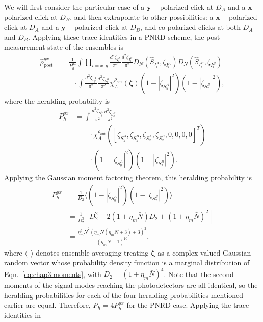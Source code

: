 \documentclass[aps,twocolumn,secnumarabic,amsmath,amssymb,pra,groupedaddress,
showpacs, showkeys]{revtex4-1}
\newcommand{\pna}[1]{\left(#1\right)}
\newcommand{\pnb}[1]{\left[#1\right]}
\begin{document}
We will first consider the particular case of a $\mathbf{y}-$polarized click at
$D_A$ and a $\mathbf{x}-$polarized click at $D_B$, and then extrapolate to
other possibilities: a $\mathbf{x}-$polarized click at $D_A$ and a
$\mathbf{y}-$polarized click at $D_B$, and co-polarized clicks at both $D_A$
and $D_B$. Applying these trace identities in a PNRD scheme, the
post-measurement state of the ensembles is
\begin{align}
\hat{\rho}_{\textrm{post}}^{yx}& =
\frac{1}{P_{h}^{yx}}\int 
\prod_{i=x,y}
\frac{d^2 \zeta_{I_i^A}}{\pi^2} 
\frac{d^2 \zeta_{I_i^B}}{\pi^2} 
D_N\pna{\hat{S}_{I_i^A},\zeta_{I_i^A}} 
D_N\pna{\hat{S}_{I_i^B},\zeta_{I_i^B}}  \nonumber \\
& \qquad \cdot \int 
\frac{d^2 \zeta_{S_y^A}}{\pi^2} 
\frac{d^2 \zeta_{S_x^B}}{\pi^2}
\chi_A^{\rho_{\textrm{out}}}\pna{\bm{\zeta}} 
\pna{1-|\zeta_{S_y^A}|^2}\pna{1-|\zeta_{S_x^B}|^2},
\end{align}
where the heralding probability is
\begin{align}
P_{h}^{yx} & =
\int 
\frac{d^2 \zeta_{S_y^A}}{\pi^2} 
\frac{d^2 \zeta_{S_x^B}}{\pi^2} \nonumber \\ 
& \qquad \cdot
\chi_A^{\rho_{\textrm{out}}}\pna{\pnb{\zeta_{S_y^A},\zeta_{S_y^B},\zeta_{S_x^A},\zeta_{S_x^B},0,0,0,0}^T}
\nonumber \\ 
& \qquad \cdot \pna{1-|\zeta_{S_y^A}|^2}\pna{1-|\zeta_{S_x^B}|^2}.
\end{align}
Applying the Gaussian moment factoring theorem, this heralding probability is
\begin{align}
P_{h}^{yx}&=\frac{1}{D_2}\langle \pna{1-|\zeta_{S_y^A}|^2}\pna{1-|\zeta_{S_x^B}|^2} \rangle \nonumber \\
	&=\frac{1}{D_2^3}\pnb{D_2^2-2\pna{1+\eta_{m}\bar{N}}D_2+\pna{1+\eta_{m}\bar{N}}^2} \nonumber \\
	& = \frac{\eta^2_{m} \bar{N}^2 (\eta_{m}  \bar{N} (\eta_{m}  \bar{N}+3)+3)^2}{(\eta_{m}  \bar{N}+1)^{10}},
\end{align}
where $\langle~~\rangle$ denotes ensemble averaging treating $\bm{\zeta}$ as a
complex-valued Gaussian random vector whose probability density function is a
marginal distribution of Eqn.~\ref{eq:chap3:moments}, with
$D_2=\pna{1+\eta_{m}\bar{N}}^4$. Note that the second-moments of
the signal modes reaching the photodetectors are all identical, so the
heralding probabilities for each of the four heralding probabilities mentioned
earlier are equal. Therefore, $P_{h}=4P_{h}^{yx}$
for the PNRD case. Applying the trace identities in
\end{document}
